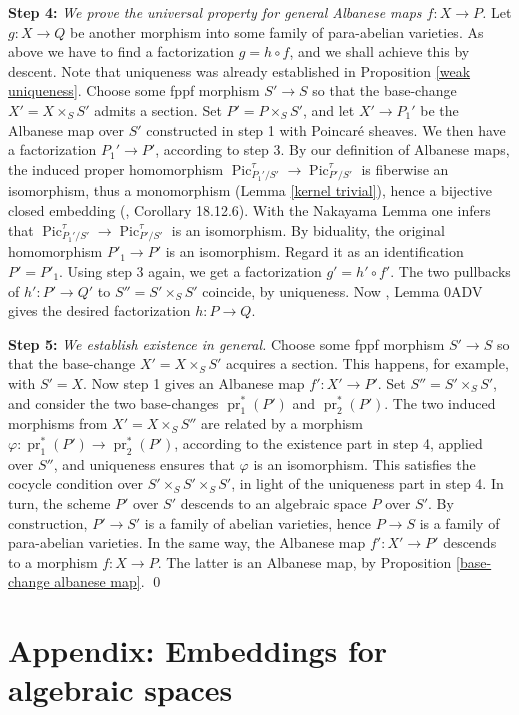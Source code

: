\documentclass[oneside, 12pt]{amsart}
\newcommand\mylabel[1]{\label{#1}\marginpar{\raggedright\vspace{-1ex}\medskip\medskip\footnotesize \tt #1}}
\renewcommand\mylabel[1]{\label{#1}}
\theoremstyle{definition}
\theoremstyle{remark}
\newcommand{\Pic}{\operatorname{Pic}}
\newcommand{\pr}{\operatorname{pr}}
\newcommand{\ra}{\rightarrow}
\begin{document}
\medskip
{\bf Step 4:}
\emph{We prove the universal property for general Albanese maps $f:X\ra P$.}
Let $g:X\ra Q$ be another morphism into some family of para-abelian varieties. As above we have  to find a factorization
$g=h\circ f$, and we shall achieve this by descent. Note that   uniqueness was already established in Proposition \ref{weak uniqueness}.
Choose some fppf morphism $S'\ra S$ so that the base-change $X'=X\times_SS'$ admits a section.
Set $P'=P\times_SS'$, and let $X'\ra P_1'$ be the Albanese map over $S'$ constructed in step 1 with Poincar\'e sheaves.
We then have a factorization $P_1'\ra P'$, according to step 3. By our definition of Albanese maps,
the induced proper homomorphism $\Pic^\tau_{P_1'/S'}\ra\Pic^\tau_{P'/S'}$ is fiberwise   an isomorphism, 
thus a monomorphism (Lemma \ref{kernel trivial}), hence a bijective closed embedding (\cite{EGA IVd}, Corollary 18.12.6).
With the Nakayama Lemma one infers that $\Pic^\tau_{P_1'/S'}\ra\Pic^\tau_{P'/S'}$ is an isomorphism.
By biduality, the original homomorphism $P'_1\ra P'$ is an isomorphism.
Regard it as an identification $P'=P'_1$. Using step 3 again, we get a factorization 
$g'=h'\circ f'$.
The two pullbacks of $h':P'\ra Q'$ to $S''=S'\times_SS'$ coincide, by   uniqueness.
Now \cite{SP},  
Lemma 0ADV gives the desired factorization $h:P\ra Q$.

\medskip
{\bf Step 5:}
\emph{We establish existence in general.}
Choose some fppf morphism $S'\ra S$ so that the base-change $X'=X\times_SS'$ acquires a section.
This happens, for example, with $S'=X$.
Now step 1 gives an Albanese map $f':X'\ra P'$.  Set $S''=S'\times_SS'$, and consider the two base-changes
$\pr_1^*(P')$ and $\pr_2^*(P')$. The  two induced morphisms from $X'=X\times_SS''$ are related by a  morphism $\varphi:\pr_1^*(P')\ra\pr_2^*(P')$,
according to the existence part in step 4, applied over $S''$, and uniqueness ensures that $\varphi$ is an isomorphism.
This satisfies the cocycle condition over  $S'\times_SS'\times_SS'$, in light of the uniqueness part in step 4.
In turn, the scheme $P'$ over $S'$ descends to an algebraic space $P$ over $S'$.
By construction, $P'\ra S'$ is a family of abelian varieties, hence $P\ra S$ is a family of para-abelian varieties.
In the same way, the Albanese map $f':X'\ra P'$ descends to a morphism $f:X\ra P$. The latter
is an Albanese map, by Proposition \ref{base-change albanese map}.
\qed


\section{Appendix:  Embeddings for algebraic spaces}
\mylabel{Appendix}
 
\end{document}
